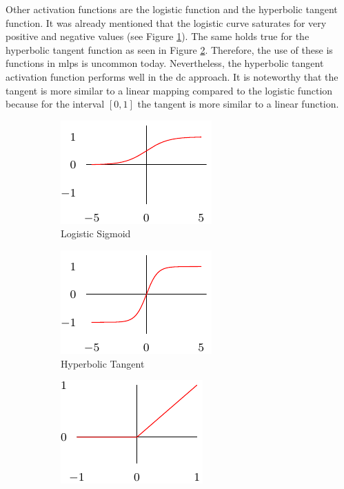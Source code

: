 Other activation functions are the logistic function and the hyperbolic tangent function. It was already mentioned that the logistic curve saturates for very positive and negative values (see Figure \ref{fig.mlp-activation-functions.sigmoid}). The same holds true for the hyperbolic tangent function as seen in Figure \ref{fig.mlp-activation-functions.tanh}.
Therefore, the use of these is functions in \glspl{mlp} is uncommon today.
Nevertheless, the hyperbolic tangent activation function performs well in the \gls{dc} approach.
It is noteworthy that the tangent is more similar to a linear mapping compared to the logistic function because for the interval $[0,1]$ the tangent is more similar to a linear function.~\cite[p.~189]{Goodfellow2016}

\begin{figure}
	\centering
	\begin{subfigure}[t]{0.25\textwidth}
		\centering
		\includegraphics{figure/sigmoid.pdf}
		\caption{Logistic Sigmoid}
		\label{fig.mlp-activation-functions.sigmoid}
	\end{subfigure}%
	\begin{subfigure}[t]{0.25\textwidth}
		\centering
		\includegraphics{figure/tanh.pdf}
		\caption{Hyperbolic Tangent}
		\label{fig.mlp-activation-functions.tanh}
	\end{subfigure}%
	\begin{subfigure}[t]{0.25\textwidth}
		\centering
		\includegraphics{figure/relu.pdf}

\end{subfigure}
\end{figure}
